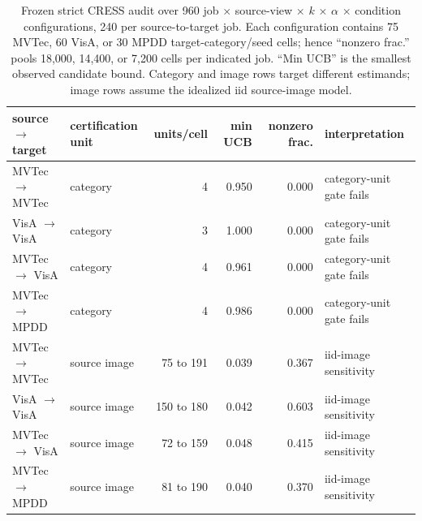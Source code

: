 \begin{table}[t]
\centering
\caption{Frozen strict CRESS audit over 960 job $\times$ source-view $\times$ $k$ $\times$ $\alpha$ $\times$ condition configurations, 240 per source-to-target job. Each configuration contains 75 MVTec, 60 VisA, or 30 MPDD target-category/seed cells; hence ``nonzero frac.'' pools 18,000, 14,400, or 7,200 cells per indicated job. ``Min UCB'' is the smallest observed candidate bound. Category and image rows target different estimands; image rows assume the idealized iid source-image model.}
\label{tab:strict-cress}
\footnotesize
\setlength{\tabcolsep}{5pt}
\begin{tabular}{llrrrl}
\toprule
source $\rightarrow$ target & certification unit & units/cell & min UCB & nonzero frac. & interpretation \\
\midrule
MVTec $\rightarrow$ MVTec & category & 4 & 0.950 & 0.000 & category-unit gate fails \\
VisA $\rightarrow$ VisA & category & 3 & 1.000 & 0.000 & category-unit gate fails \\
MVTec $\rightarrow$ VisA & category & 4 & 0.961 & 0.000 & category-unit gate fails \\
MVTec $\rightarrow$ MPDD & category & 4 & 0.986 & 0.000 & category-unit gate fails \\
\midrule
MVTec $\rightarrow$ MVTec & source image & 75 to 191 & 0.039 & 0.367 & iid-image sensitivity \\
VisA $\rightarrow$ VisA & source image & 150 to 180 & 0.042 & 0.603 & iid-image sensitivity \\
MVTec $\rightarrow$ VisA & source image & 72 to 159 & 0.048 & 0.415 & iid-image sensitivity \\
MVTec $\rightarrow$ MPDD & source image & 81 to 190 & 0.040 & 0.370 & iid-image sensitivity \\
\bottomrule
\end{tabular}
\end{table}

